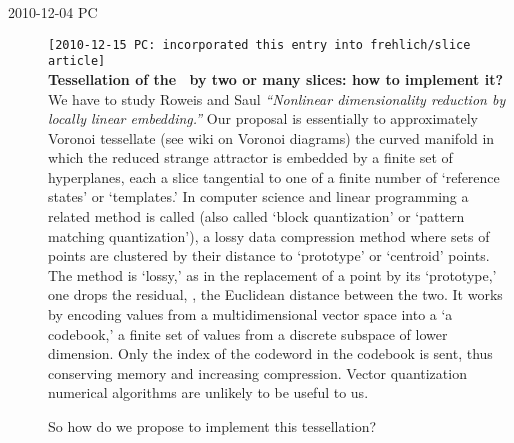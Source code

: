 \begin{description}
\item[2010-12-04 PC] \texttt{[2010-12-15 PC: incorporated this entry into
frehlich/slice article]}
\\
{\bf Tessellation of the \reducedsp\ by two or many slices:
how to implement it?}
We have to study Roweis%
 and Saul
\emph{``Nonlinear dimensionality reduction by locally linear embedding.''}
Our proposal is essentially to approximately
 {Voronoi
tessellate} (see 
{wiki on Voronoi diagrams}) the curved manifold in which the reduced
strange attractor is embedded by a finite set of hyperplanes, each a
slice tangential to one of a finite number of `reference states' or
`templates.' In computer science and linear programming a related method
is called  (also called `block quantization' or `pattern matching
quantization'), a lossy data compression method where sets of points are
clustered by their distance to `prototype' or `centroid' points. The
method is `lossy,' as in the replacement of a point by its `prototype,'
one drops the residual, \ie, the Euclidean distance between the two. It
works by encoding values from a multidimensional vector space into a `a
codebook,' a finite set of values from a discrete subspace of lower
dimension. Only the index of the codeword in the codebook is sent, thus
conserving memory and increasing compression. Vector quantization
numerical algorithms are unlikely to be useful to us.

So how do we propose to implement this tessellation?




\end{description}
